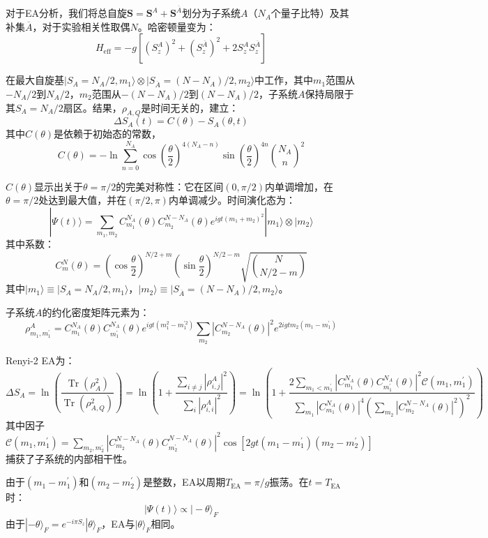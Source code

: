\documentclass[11pt,a4paper]{article}
\begin{document}
对于EA分析，我们将总自旋$\bm{S} = \bm{S}^A + \bm{S}^{\overline{A}}$划分为子系统$A$（$N_A$个量子比特）及其补集$\overline{A}$，对于实验相关性取偶$N$。哈密顿量变为：
\[
H_{\text{eff}} = -g\left[(S_z^A)^2 + (S_z^{\overline{A}})^2 + 2S_z^A S_z^{\overline{A}}\right]
\]

在最大自旋基$|S_A=N_A/2,m_1\rangle \otimes |S_{\overline{A}}=(N-N_A)/2,m_2\rangle$中工作，其中$m_1$范围从$-N_A/2$到$N_A/2$，$m_2$范围从$-(N-N_A)/2$到$(N-N_A)/2$，子系统$A$保持局限于其$S_A=N_A/2$扇区。结果，$\rho_{A,Q}$是时间无关的，建立：
\[
\Delta S_A(t) = C(\theta) - S_A(\theta,t)
\]
其中$C(\theta)$是依赖于初始态的常数，
\[
C(\theta) = -\ln\sum_{n=0}^{N_A} \cos\left(\frac{\theta}{2}\right)^{4(N_A-n)} \sin\left(\frac{\theta}{2}\right)^{4n} \binom{N_A}{n}^2
\]

$C(\theta)$显示出关于$\theta=\pi/2$的完美对称性：它在区间$(0,\pi/2)$内单调增加，在$\theta=\pi/2$处达到最大值，并在$(\pi/2,\pi)$内单调减少。时间演化态为：
\[
|\Psi(t)\rangle = \sum_{m_1,m_2} C^{N_A}_{m_1}(\theta) C^{N-N_A}_{m_2}(\theta) e^{igt(m_1+m_2)^2} |m_1\rangle \otimes |m_2\rangle
\]
其中系数：
\[
C^{N}_{m}(\theta) = \left(\cos\frac{\theta}{2}\right)^{N/2+m} \left(\sin\frac{\theta}{2}\right)^{N/2-m} \sqrt{\binom{N}{N/2-m}}
\]
其中$|m_1\rangle \equiv |S_A=N_A/2,m_1\rangle$，$|m_2\rangle \equiv |S_{\overline{A}}=(N-N_A)/2,m_2\rangle$。

子系统$A$的约化密度矩阵元素为：
\[
\rho^{A}_{m_1,m^{\prime}_1} = C^{N_A}_{m_1}(\theta) C^{N_A}_{m^{\prime}_1}(\theta) e^{igt(m_1^2-m^{\prime 2}_1)} \sum_{m_2} |C^{N-N_A}_{m_2}(\theta)|^2 e^{2igtm_2(m_1-m^{\prime}_1)}
\]

Renyi-2 EA为：
\[
\Delta S_A = \ln\left(\frac{\operatorname{Tr}(\rho^2_A)}{\operatorname{Tr}(\rho^2_{A,Q})}\right)
= \ln\left(1 + \frac{\sum_{i\neq j}|\rho^A_{i,j}|^2}{\sum_{i}|\rho^A_{i,i}|^2}\right)
= \ln\left(1 + \frac{2\sum_{m_1<m^{\prime}_1}|C^{N_A}_{m_1}(\theta)C^{N_A}_{m^{\prime}_1}(\theta)|^2 \mathcal{C}(m_1,m^{\prime}_1)}{\sum_{m_1}|C^{N_A}_{m_1}(\theta)|^4 \left(\sum_{m_2}|C^{N-N_A}_{m_2}(\theta)|^2\right)^2}\right)
\]
其中因子$\mathcal{C}(m_1,m^{\prime}_1) = \sum_{m_2,m^{\prime}_2}|C^{N-N_A}_{m_2}(\theta)C^{N-N_A}_{m^{\prime}_2}(\theta)|^2 \cos[2gt(m_1-m^{\prime}_1)(m_2-m^{\prime}_2)]$捕获了子系统的内部相干性。

由于$(m_1-m^{\prime}_1)$和$(m_2-m^{\prime}_2)$是整数，EA以周期$T_{\text{EA}} = \pi/g$振荡。在$t=T_{\text{EA}}$时：
\[
|\Psi(t)\rangle \propto |-\theta\rangle_F
\]
由于$|-\theta\rangle_F = e^{-i\pi S_z}|\theta\rangle_F$，EA与$|\theta\rangle_F$相同。
\end{document}
